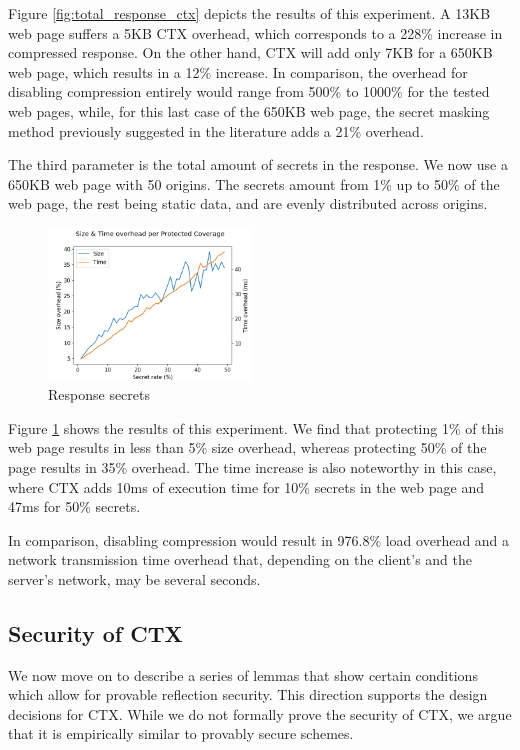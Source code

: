 Figure \ref{fig:total_response_ctx} depicts the results of this experiment. A
13KB web page suffers a 5KB CTX overhead, which corresponds to a 228\% increase
in compressed response. On the other hand, CTX will add only 7KB for a 650KB web
page, which results in a 12\% increase. In comparison, the overhead for
disabling compression entirely would range from 500\% to 1000\% for the tested
web pages, while, for this last case of the 650KB web page, the secret masking
method previously suggested in the literature adds a 21\% overhead.

The third parameter is the total amount of secrets in the response. We now use
a 650KB web page with 50 origins. The secrets amount from 1\% up to 50\% of the
web page, the rest being static data, and are evenly distributed across origins.

    \begin{figure}[thpb]
        \centering
            \includegraphics[width=0.48\textwidth]{experiments/ctx_performance/response_secrets.png}
        \caption{Response secrets}
        \label{fig:response_secrets_ctx}
    \end{figure}

Figure \ref{fig:response_secrets_ctx} shows the results of this experiment. We
find that protecting 1\% of this web page results in less than 5\% size
overhead, whereas protecting 50\% of the page results in 35\% overhead. The time
increase is also noteworthy in this case, where CTX adds 10ms of execution time
for 10\% secrets in the web page and 47ms for 50\% secrets.

In comparison, disabling compression would result in 976.8\% load overhead
and a network transmission time overhead that, depending on the client's and the
server's network, may be several seconds.

\subsection{Security of CTX}

We now move on to describe a series of lemmas that show certain conditions
which allow for provable reflection security. This direction supports
the design decisions for CTX. While we do not formally prove the security of
CTX, we argue that it is empirically similar to provably secure schemes.

